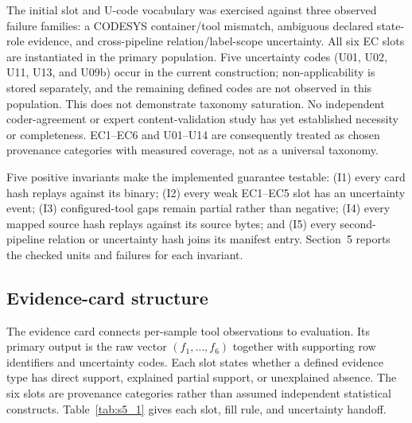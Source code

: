 \documentclass[manuscript,screen,review]{acmart}
\begin{document}
The initial slot and U-code vocabulary was exercised against three observed failure families: a CODESYS container/tool mismatch, ambiguous declared state-role evidence, and cross-pipeline relation/label-scope uncertainty. All six EC slots are instantiated in the primary population. Five uncertainty codes (U01, U02, U11, U13, and U09b) occur in the current construction; non-applicability is stored separately, and the remaining defined codes are not observed in this population. This does not demonstrate taxonomy saturation. No independent coder-agreement or expert content-validation study has yet established necessity or completeness. EC1--EC6 and U01--U14 are consequently treated as chosen provenance categories with measured coverage, not as a universal taxonomy.

Five positive invariants make the implemented guarantee testable: (I1) every card hash replays against its binary; (I2) every weak EC1--EC5 slot has an uncertainty event; (I3) configured-tool gaps remain partial rather than negative; (I4) every mapped source hash replays against its source bytes; and (I5) every second-pipeline relation or uncertainty hash joins its manifest entry. Section~5 reports the checked units and failures for each invariant.

\subsection{Evidence-card structure}

The evidence card connects per-sample tool observations to evaluation. Its primary output is the raw vector $(f_1,\ldots,f_6)$ together with supporting row identifiers and uncertainty codes. Each slot states whether a defined evidence type has direct support, explained partial support, or unexplained absence. The six slots are provenance categories rather than assumed independent statistical constructs. Table~\ref{tab:s5_1} gives each slot, fill rule, and uncertainty handoff.
\end{document}
